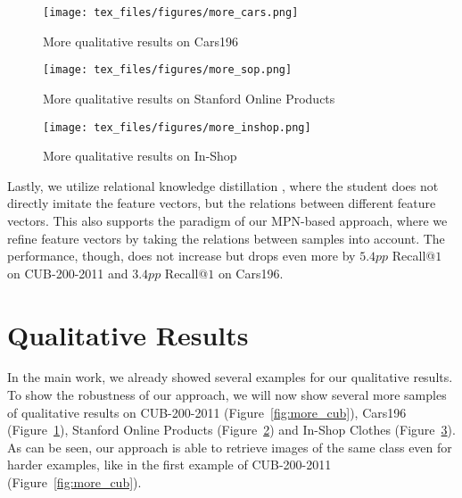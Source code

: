 \documentclass{article}
\begin{document}
\begin{figure}[ht]
    \begin{center}
    \centerline{\texttt{[image: tex\_files/figures/more\_cars.png]}}
    \caption{More qualitative results on Cars196}
    \label{fig:more_cars}
    \end{center}
    \vspace{-0.5cm}
\end{figure}

\begin{figure}[ht]
    \begin{center}
    \centerline{\texttt{[image: tex\_files/figures/more\_sop.png]}}
    \caption{More qualitative results on Stanford Online Products}
    \label{fig:more_sop}
    \end{center}
\end{figure}
\begin{figure}[ht]
    \begin{center}
    \centerline{\texttt{[image: tex\_files/figures/more\_inshop.png]}}
    \caption{More qualitative results on In-Shop}
    \label{fig:more_inshop}
    \end{center}
    \vspace{-0.5cm}
\end{figure} 
 
 Lastly, we utilize relational knowledge distillation \cite{DBLP:conf/cvpr/ParkKLC19}, where the student does not directly imitate the feature vectors, but the relations between different feature vectors. This also supports the paradigm of our MPN-based approach, where we refine feature vectors by taking the relations between samples into account. The performance, though, does not increase but drops even more by $5.4pp$ Recall@$1$ on CUB-200-2011 and $3.4pp$ Recall@$1$ on Cars196. 



\section{Qualitative Results}
\label{sec:quali}
In the main work, we already showed several examples for our qualitative results. To show the robustness of our approach, we will now show several more samples of qualitative results on CUB-200-2011 (Figure~\ref{fig:more_cub}), Cars196 (Figure~\ref{fig:more_cars}), Stanford Online Products (Figure~\ref{fig:more_sop}) and In-Shop Clothes (Figure~\ref{fig:more_inshop}). As can be seen, our approach is able to retrieve images of the same class even for harder examples, like in the first example of CUB-200-2011 (Figure~\ref{fig:more_cub}). 
\end{document}
